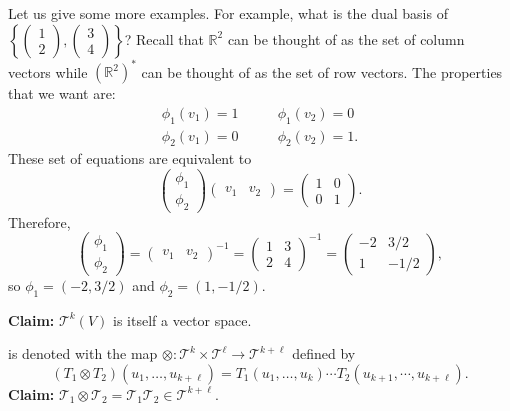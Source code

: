 \documentclass{article}
\numberwithin{equation}{section}
\begin{document}
Let us give some more examples. For example, what is the dual basis of $\left\{\begin{pmatrix}
    1 \\ 2
\end{pmatrix},\begin{pmatrix}
    3 \\ 4
\end{pmatrix}\right\}$? Recall that $\mathbb{R}^2$ can be thought of as the set of column vectors while $(\mathbb{R}^2)^*$ can be thought of as the set of row vectors. The properties that we want are:
\begin{align}
    \phi_1(v_1) = 1 &\quad\quad \phi_1(v_2) = 0 \\
    \phi_2(v_1) = 0 &\quad\quad \phi_2(v_2) = 1.
\end{align}
These set of equations are equivalent to
\begin{equation}
    \begin{pmatrix}
        \phi_1 \\ 
        \phi_2
    \end{pmatrix}
    \begin{pmatrix}
        v_1 & v_2
    \end{pmatrix}
    = \begin{pmatrix}
        1 & 0 \\
        0 & 1
    \end{pmatrix}.
\end{equation}
Therefore,
\begin{equation}
    \begin{pmatrix}
        \phi_1 \\ \phi_2
    \end{pmatrix} = \begin{pmatrix}
        v_1 & v_2
    \end{pmatrix}^{-1} = \begin{pmatrix}
        1 & 3 \\ 
        2 & 4
    \end{pmatrix}^{-1} = \begin{pmatrix}
        -2 & 3/2 \\ 
        1 & -1/2
    \end{pmatrix},
\end{equation}
so $\phi_1=(-2,3/2)$ and $\phi_2=(1,-1/2)$.

\textbf{Claim:} $\mathcal{T}^k(V)$ is itself a vector space.

 is denoted with the map $\otimes:\mathcal{T}^k \times \mathcal{T}^\ell \rightarrow \mathcal{T}^{k+\ell}$ defined by 
\begin{equation}
    (T_1 \otimes T_2)(u_1,\dots,u_{k+\ell}) = T_1(u_1,\dots,u_k)\cdots T_2(u_{k+1},\cdots,u_{k+\ell}).
\end{equation}
\textbf{Claim:} $\mathcal{T}_1\otimes \mathcal{T}_2 = \mathcal{T}_1\mathcal{T}_2 \in \mathcal{T}^{k+\ell}$.
\end{document}
